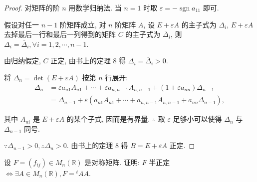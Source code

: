 \documentclass{ctexart}
\begin{document}
\begin{proof}
    对矩阵的阶 $n$ 用数学归纳法. 当 $n=1$ 时取 $\varepsilon=-\operatorname{sgn}a_{11}$ 即可.

    假设对任一 $n-1$ 阶矩阵成立, 对 $n$ 阶矩阵 $A$, 设 $E+\varepsilon A$ 的主子式为 $\Delta_i$, $E+\varepsilon A$ 去掉最后一行和最后一列得到的矩阵 $C$ 的主子式为 $\overline{\Delta}_i$, 则 $\Delta_i=\overline{\Delta}_i,\forall i=1,2,\cdots,n-1$.

    由归纳假定, $C$ 正定, 由书上的定理 8 得 $\Delta_i=\overline{\Delta}_i>0$.
    
    将 $\Delta_n=\det(E+\varepsilon A)$ 按第 $n$ 行展开:
    \begin{align*}
        \Delta_n & =\varepsilon a_{n1}A_{n1}+\cdots+\varepsilon a_{n,n-1}A_{n,n-1}+(1+\varepsilon a_{nn})\Delta_{n-1} \\
        & =\Delta_{n-1}+\varepsilon(a_{n1}A_{n1}+\cdots+a_{n,n-1}A_{n,n-1}+a_{nn}\Delta_{n-1}),
    \end{align*}

    其中 $A_{ni}$ 是 $E+\varepsilon A$ 的某个子式, 因而是有界量. $\therefore$ 取 $\varepsilon$ 足够小可以使得 $\Delta_n$ 与 $\Delta_{n-1}$ 同号.
    
    $\because\Delta_{n-1}>0,\therefore\Delta_n>0$. 由书上的定理 8 得 $B=E+\varepsilon A$ 正定.
\end{proof}
\begin{exercisec}\label{exc6}
    设 $F=(f_{ij})\in M_n(\mathbb{R})$ 是对称矩阵. 证明: $F$ 半正定 $\Leftrightarrow\exists A\in M_n(\mathbb{R}),F={}^tAA$.
\end{exercisec}
\end{document}

